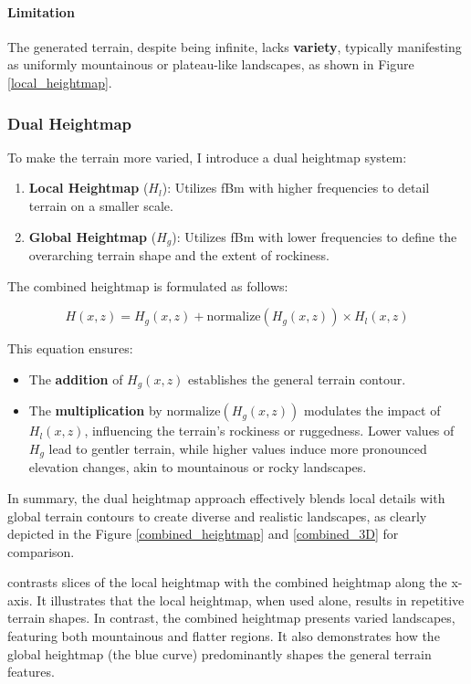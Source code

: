 \paragraph{Limitation}
The generated terrain, despite being infinite, lacks \textbf{variety}, typically manifesting as uniformly mountainous or plateau-like landscapes, as shown in Figure \ref{local_heightmap}.


\subsubsection{Dual Heightmap}
\label{Dual Heightmap}

To make the terrain more varied, I introduce a dual heightmap system:

\begin{enumerate}
    \item \textbf{Local Heightmap} ($H_{l}$): Utilizes fBm with higher frequencies to detail terrain on a smaller scale.
    \item \textbf{Global Heightmap} ($H_{g}$): Utilizes fBm with lower frequencies to define the overarching terrain shape and the extent of rockiness.
\end{enumerate}

The combined heightmap is formulated as follows:

\begin{equation}
H(x,z) = H_{g}(x,z) + \text{normalize}(H_{g}(x,z))\times H_{l}(x,z)
\end{equation}

This equation ensures:

\begin{itemize}
    \item The \textbf{addition} of $H_{g}(x,z)$ establishes the general terrain contour.
    \item The \textbf{multiplication} by $\text{normalize}(H_{g}(x,z))$ modulates the impact of $H_{l}(x,z)$, influencing the terrain's rockiness or ruggedness. Lower values of $H_{g}$ lead to gentler terrain, while higher values induce more pronounced elevation changes, akin to mountainous or rocky landscapes.
\end{itemize}

In summary, the dual heightmap approach effectively blends local details with global terrain contours to create diverse and realistic landscapes, as clearly depicted in the Figure \ref{combined_heightmap} and \ref{combined_3D} for comparison.

{contrasts slices of the local heightmap with the combined heightmap along the x-axis. It illustrates that the local heightmap, when used alone, results in repetitive terrain shapes. In contrast, the combined heightmap presents varied landscapes, featuring both mountainous and flatter regions. It also demonstrates how the global heightmap (the blue curve) predominantly shapes the general terrain features.}

